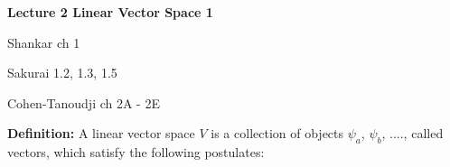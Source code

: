 


\begin{Large}
\noindent
{\bf Lecture 2 \newline
Linear Vector Space 1}
\end{Large}
\vspace{1 cm}

\begin{list}{}{Chapter readings:}
\item Shankar ch 1
\item Sakurai 1.2, 1.3, 1.5
\item Cohen-Tanoudji ch 2A - 2E
\end{list}

 


\noindent
{\bf Definition:} A linear vector space $V$ is a collection of objects $\psi_{a}$, $\psi_{b}$, ...., called vectors, which satisfy the following postulates:
